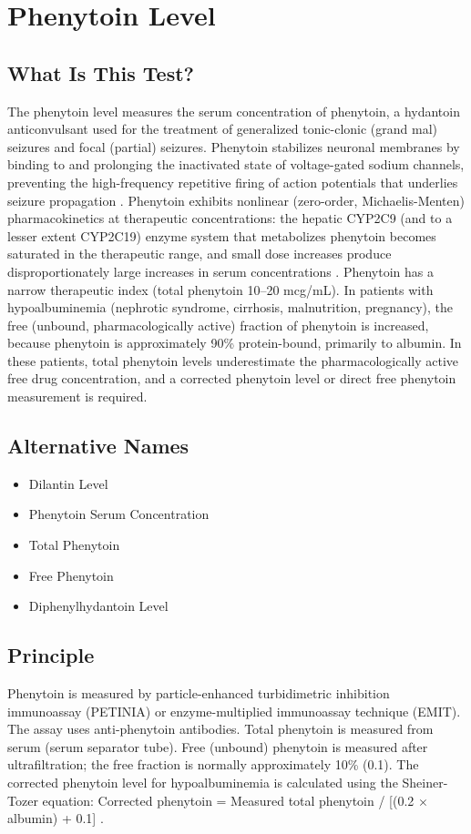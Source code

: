\chapter{Phenytoin Level}

\section*{What Is This Test?}
The phenytoin level measures the serum concentration of phenytoin, a hydantoin anticonvulsant used for the treatment of generalized tonic-clonic (grand mal) seizures and focal (partial) seizures. Phenytoin stabilizes neuronal membranes by binding to and prolonging the inactivated state of voltage-gated sodium channels, preventing the high-frequency repetitive firing of action potentials that underlies seizure propagation \cite{brodie1996antiepileptic}. Phenytoin exhibits nonlinear (zero-order, Michaelis-Menten) pharmacokinetics at therapeutic concentrations: the hepatic CYP2C9 (and to a lesser extent CYP2C19) enzyme system that metabolizes phenytoin becomes saturated in the therapeutic range, and small dose increases produce disproportionately large increases in serum concentrations \cite{anderson2008pharmacokinetic}. Phenytoin has a narrow therapeutic index (total phenytoin 10--20 mcg/mL). In patients with hypoalbuminemia (nephrotic syndrome, cirrhosis, malnutrition, pregnancy), the free (unbound, pharmacologically active) fraction of phenytoin is increased, because phenytoin is approximately 90\% protein-bound, primarily to albumin. In these patients, total phenytoin levels underestimate the pharmacologically active free drug concentration, and a corrected phenytoin level or direct free phenytoin measurement is required.

\section*{Alternative Names}
\begin{itemize}
  \item Dilantin Level
  \item Phenytoin Serum Concentration
  \item Total Phenytoin
  \item Free Phenytoin
  \item Diphenylhydantoin Level
\end{itemize}
\section*{Principle}
Phenytoin is measured by particle-enhanced turbidimetric inhibition immunoassay (PETINIA) or enzyme-multiplied immunoassay technique (EMIT). The assay uses anti-phenytoin antibodies. Total phenytoin is measured from serum (serum separator tube). Free (unbound) phenytoin is measured after ultrafiltration; the free fraction is normally approximately 10\% (0.1). The corrected phenytoin level for hypoalbuminemia is calculated using the Sheiner-Tozer equation: Corrected phenytoin = Measured total phenytoin / [(0.2 $\times$ albumin) + 0.1] \cite{burton2006applied}.

